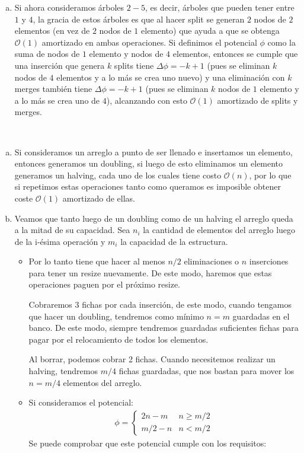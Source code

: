 \documentclass[dcc,uchile]{fcfmcourse}
\begin{document}
\begin{problems}
\begin{enumerate}[a)]
    \item Si ahora consideramos árboles $2-5$, es decir, árboles que pueden tener entre $1$ y $4$, la gracia de estos árboles es que al hacer split se generan $2$ nodos de $2$ elementos (en vez de $2$ nodos de $1$ elemento) que ayuda a que se obtenga $\mathcal{O}(1)$ amortizado en ambas operaciones. Si definimos el potencial $\phi$ como la suma de nodos de $1$ elemento y nodos de $4$ elementos, entonces se cumple que una inserción que genera $k$ splits tiene $\Delta \phi = -k+1$ (pues se eliminan $k$ nodos de $4$ elementos y a lo más se crea uno nuevo) y una eliminación con $k$ merges también tiene $\Delta \phi = -k+1$ (pues se eliminan $k$ nodos de $1$ elemento y a lo más se crea uno de $4$), alcanzando con esto $\mathcal{O}(1)$ amortizado de splits y merges.
\end{enumerate}
\\
\begin{enumerate}[a)]
    \item Si consideramos un arreglo a punto de ser llenado e insertamos un elemento, entonces generamos un doubling, si luego de esto eliminamos un elemento generamos un halving, cada uno de los cuales tiene costo $\mathcal{O}(n)$, por lo que si repetimos estas operaciones tanto como queramos es imposible obtener coste $\mathcal{O}(1)$ amortizado de ellas.
    \item Veamos que tanto luego de un doubling como de un halving el arreglo queda a la mitad de su capacidad. Sea $n_i$ la cantidad de elementos del arreglo luego de la i-ésima operación y $m_i$ la capacidad de la estructura.
    \begin{itemize}
        \item Por lo tanto tiene que hacer al menos $n/2$  eliminaciones o $n$ inserciones para tener un resize nuevamente. De este modo, haremos que estas operaciones paguen por el próximo resize.
        
        Cobraremos 3 fichas por cada inserción, de este modo, cuando tengamos que hacer un doubling, tendremos como mínimo $n=m$ guardadas en el banco. De este modo, siempre tendremos guardadas suficientes fichas para pagar por el relocamiento de todos los elementos.
        
        Al borrar, podemos cobrar 2 fichas. Cuando necesitemos realizar un halving, tendremos $m/4$ fichas guardadas, que nos bastan para mover los $n=m/4$ elementos del arreglo. 
        
        \item Si consideramos el potencial:
        \begin{align*}
            \phi =
            \begin{cases}
            2n - m & n\ge m/2\\
            m/2 - n & n < m/2
            \end{cases}
        \end{align*}
        Se puede comprobar que este potencial cumple con los requisitos: 
        

\end{itemize}
\end{enumerate}
\end{problems}
\end{document}

